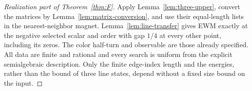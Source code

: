 \begin{proof}[Realization part of Theorem~\ref{thm:F}]
Apply Lemma~\ref{lem:three-upper}, convert the matrices by Lemma~\ref{lem:matrix-conversion}, and use their equal-length lists in the nearest-neighbor magnet. Lemma~\ref{lem:line-transfer} gives EWM exactly at the negative selected scalar and order with gap \(1/4\) at every other point, including its zeros. The color half-turn and observable are those already specified. All data are finite and rational and every search is uniform from the explicit semialgebraic description. Only the finite edge-index length and the energies, rather than the bound of three line states, depend without a fixed size bound on the input.
\end{proof}



